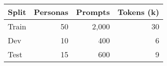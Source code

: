 \begin{tabular}{lrrr}
\toprule
Split & Personas & Prompts & Tokens (k) \\
\midrule
Train & 50 & 2,000 & 30 \\
Dev & 10 & 400 & 6 \\
Test & 15 & 600 & 9 \\
\bottomrule
\end{tabular}
